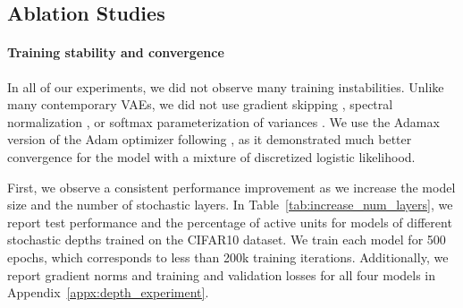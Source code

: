 



\subsection{Ablation Studies}\label{sect:ablation}


\paragraph{Training stability and convergence}


In all of our experiments, we did not observe many training instabilities. 
Unlike many contemporary VAEs, we did not use gradient skipping \citep{Child2020-ze}, spectral normalization \citep{vahdat2020nvae}, or softmax parameterization of variances \citep{hazami2022efficientvdvae}. 
We use the Adamax version of the Adam optimizer \citep{kingma2015adam} following \citet{hazami2022efficientvdvae}, as it demonstrated much better convergence for the model with a mixture of discretized logistic likelihood. 

First, we observe a consistent performance improvement as we increase the model size and the number of stochastic layers. 
In Table~\ref{tab:increase_num_layers}, we report test performance and the percentage of active units 
for models of different stochastic depths trained on the CIFAR10 dataset. 
We train each model for 500 epochs, which corresponds to less than 200k training iterations. 
Additionally, we report gradient norms and training and validation losses for all four models in Appendix~\ref{appx:depth_experiment}. 


